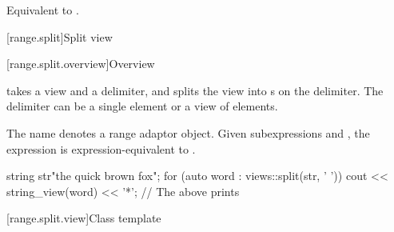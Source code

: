 \begin{itemdescr}
\pnum
\effects
Equivalent to
.
\end{itemdescr}

[range.split]{Split view}

[range.split.overview]{Overview}

\pnum
{} takes a view and a delimiter, and
splits the view into s on the delimiter.
The delimiter can be a single element or a view of elements.

\pnum
The name  denotes
a range adaptor object.
Given subexpressions  and ,
the expression  is expression-equivalent to
.

\pnum
\begin{example}
\begin{codeblock}
string str{"the quick brown fox"};
for (auto word : views::split(str, ' ')) {
  cout << string_view(word) << '*';
}
// The above prints 
\end{codeblock}
\end{example}

[range.split.view]{Class template }

